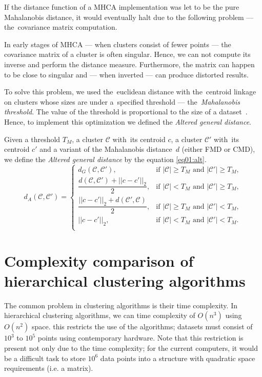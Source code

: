 If the distance function of a MHCA implementation was let to be the pure Mahalanobis distance, it would eventually halt due to the following problem --- the~covariance matrix computation.

In early stages of MHCA --- when clusters consist of fewer points --- the covariance matrix of a cluster is often singular. Hence, we can not compute its inverse and perform the distance measure. Furthermore, the matrix can happen to be close to singular and --- when inverted --- can produce distorted results.

To solve this problem, we used the~euclidean distance with the~centroid linkage on clusters whose sizes are under a~specified threshold --- the~\emph{Mahalanobis threshold}. The value of the threshold is proportional to the size of a dataset~\cite{fivser2012detection}. Hence, to implement this optimization we defined the \emph{Altered general distance}.

\begin{defn}
	Given a threshold $T_M$, a cluster $\mathcal{C}$ with~its centroid $c$, a cluster $\mathcal{C}'$ with~its centroid $c'$ and a variant of the Mahalanobis distance~$d$ (either FMD or CMD), we define the \emph{Altered general distance} by the equation \ref{eq01:alt}.
	\begin{equation}
	d_A(\mathcal{C},\mathcal{C}')=
	\begin{cases}
	d_G(\mathcal{C}, \mathcal{C}'), & \text{if $|\mathcal{C}|\ge T_M$ and $|\mathcal{C}'|\ge T_M$},\\
	\dfrac{d(\mathcal{C}, \mathcal{C}')+||c-c'||_2}{2}, & \text{if $|\mathcal{C}| < T_M$ and $|\mathcal{C}'|\ge T_M$},\\
	\dfrac{||c-c'||_2+d(\mathcal{C}', \mathcal{C})}{2}, & \text{if $|\mathcal{C}|\ge T_M$ and $|\mathcal{C}'|< T_M$},\\
	||c-c'||_2, & \text{if $|\mathcal{C}|< T_M$ and $|\mathcal{C}'|< T_M$}.\\
	\end{cases}
	\label{eq01:alt}
	\end{equation}
	\label{def01:alt}
\end{defn}



\section{Complexity comparison of hierarchical clustering algorithms }

The common problem in clustering algorithms is their time complexity. In hierarchical clustering algorithms, we can  time complexity of $O(n^3)$ using $O(n^2)$ space.  this restricts the use of the algorithms; datasets must consist of $10^3$ to $10^5$ points  using  contemporary hardware. Note that this restriction is present not only due to the time complexity; for the current computers, it would be a difficult task to store $10^6$ data points into a structure with quadratic space requirements (i.e. a matrix).

